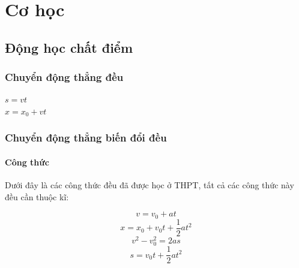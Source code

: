 \chapter{Cơ học}
\section{Động học chất điểm}
\subsection{Chuyển động thẳng đều}
\begin{center}
    $s=vt$\\
    $x=x_{0}+vt$\\
\end{center}
\subsection{Chuyển động thẳng biến đổi đều}
\subsubsection{Công thức}
Dưới đây là các công thức đều đã được học ở THPT, tất cả các công thức này đều cần thuộc kĩ:
\begin{tcolorbox}
    $$v=v_{0}+at$$
    $$x=x_{0}+v_{0}t+\frac{1}{2}at^2$$
    $$v^2-v_{0}^2=2as$$
    $$s=v_{0}t+\frac{1}{2}at^2$$
\end{tcolorbox}

